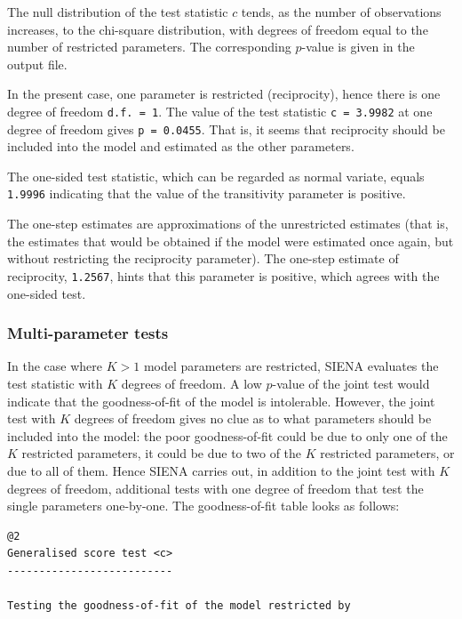\documentclass[a4paper,fleqn]{article}
\newcommand{\+}{\, + \,}
\newcommand{\SI}{{\sf SIENA }}
\begin{document}
{The null distribution of the test statistic $c$ tends,
as the number of observations increases, to the chi-square
distribution, with degrees of freedom equal to the
number of restricted parameters. The corresponding $p$-value is
given in the output file.

In the present case, one parameter is restricted (reciprocity),
hence there is one degree of freedom {\tt d.f. = 1}. The value of
the test statistic {\tt c = 3.9982} at one degree of freedom
gives {\tt p = 0.0455}.
That is, it seems that reciprocity
should be included into the model and estimated as the other
parameters.

The one-sided test statistic, which can be regarded as normal variate, equals {\tt 1.9996}
indicating that the value of the transitivity parameter is positive.

The one-step estimates are approximations of the unrestricted estimates (that is,
the estimates that would be obtained if the model were estimated once again,
but without restricting the reciprocity parameter).
The one-step estimate of reciprocity, {\tt 1.2567},
hints that this parameter is positive,
which agrees with the one-sided test.

\subsubsection{Multi-parameter tests}

In the case where $K > 1$ model parameters are restricted, \SI
evaluates the test statistic with $K$ degrees of freedom. A low
$p$-value of the joint test would indicate that the
goodness-of-fit of the model is intolerable. However, the joint
test with $K$ degrees of freedom gives no clue as to what parameters
should be included into the model: the poor goodness-of-fit could be
due to only one of the $K$ restricted parameters, it could be due to
two of the $K$ restricted parameters, or due to all of them. Hence
\SI carries out, in addition to the joint test with $K$ degrees of
freedom, additional tests with one degree of freedom that test the
single parameters one-by-one. The goodness-of-fit table looks as
follows:

\begin{verbatim}
@2
Generalised score test <c>
--------------------------

Testing the goodness-of-fit of the model restricted by


\end{verbatim}}
\end{document}
